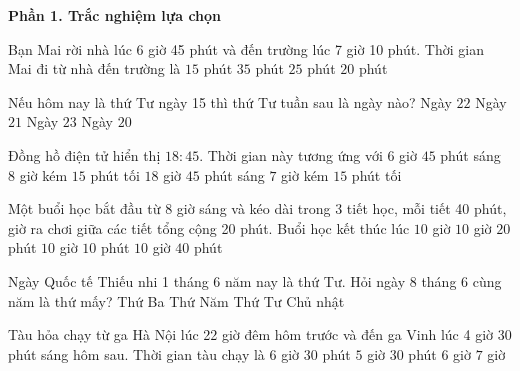 \textbf{Phần 1. Trắc nghiệm lựa chọn}

\begin{ex} %
Bạn Mai rời nhà lúc 6 giờ 45 phút và đến trường lúc 7 giờ 10 phút. Thời gian Mai đi từ nhà đến trường là
\choice
{$15$ phút}
{$35$ phút}
{\True $25$ phút}
{$20$ phút}
\end{ex}

\begin{ex} %
Nếu hôm nay là thứ Tư ngày 15 thì thứ Tư tuần sau là ngày nào?
\choice
{\True Ngày $22$}
{Ngày $21$}
{Ngày $23$}
{Ngày $20$}
\end{ex}

\begin{ex} %
Đồng hồ điện tử hiển thị $18:45$. Thời gian này tương ứng với
\choice
{$6$ giờ $45$ phút sáng}
{$8$ giờ kém $15$ phút tối}
{$18$ giờ $45$ phút sáng}
{\True $7$ giờ kém $15$ phút tối}
\end{ex}

\begin{ex} %
Một buổi học bắt đầu từ 8 giờ sáng và kéo dài trong 3 tiết học, mỗi tiết 40 phút, giờ ra chơi giữa các tiết tổng cộng 20 phút. Buổi học kết thúc lúc
\choice
{$10$ giờ}
{\True $10$ giờ $20$ phút}
{$10$ giờ $10$ phút}
{$10$ giờ $40$ phút}
\end{ex}

\begin{ex} %
Ngày Quốc tế Thiếu nhi 1 tháng 6 năm nay là thứ Tư. Hỏi ngày 8 tháng 6 cùng năm là thứ mấy?
\choice
{Thứ Ba}
{Thứ Năm}
{\True Thứ Tư}
{Chủ nhật}
\end{ex}

\begin{ex} %
Tàu hỏa chạy từ ga Hà Nội lúc 22 giờ đêm hôm trước và đến ga Vinh lúc 4 giờ 30 phút sáng hôm sau. Thời gian tàu chạy là
\choice
{\True $6$ giờ $30$ phút}
{$5$ giờ $30$ phút}
{$6$ giờ}
{$7$ giờ}
\end{ex}

